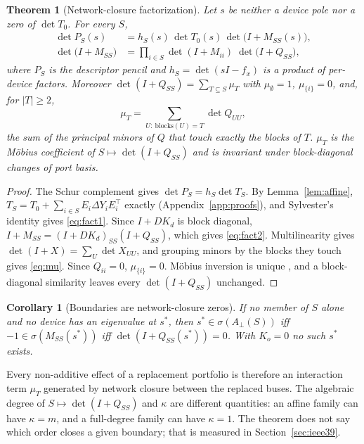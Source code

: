 \documentclass[journal]{IEEEtran}
\newtheorem{theorem}{Theorem}
\newtheorem{corollary}{Corollary}
\theoremstyle{definition}
\theoremstyle{remark}
\newcommand{\Aperp}{A_{\perp}}
\begin{document}
\begin{theorem}[Network-closure factorization]\label{thm:factorization}
Let $s$ be neither a device pole nor a zero of $\det T_0$. For every $S$,
\begin{align}
\det P_S(s)&=h_S(s)\,\det T_0(s)\,\det\!\big(I+M_{SS}(s)\big),\label{eq:fact1}\\
\det\!\big(I+M_{SS}\big)&=\prod_{i\in S}\det(I+M_{ii})\;\det\!\big(I+Q_{SS}\big),
\label{eq:fact2}
\end{align}
where $P_S$ is the descriptor pencil and $h_S=\det(sI-f_x)$ is a product of
per-device factors. Moreover $\det(I+Q_{SS})=\sum_{T\subseteq S}\mu_T$ with
$\mu_\emptyset=1$, $\mu_{\{i\}}=0$, and, for $|T|\ge2$,
\begin{equation}\label{eq:mu}
\mu_T=\sum_{U:\ \mathrm{blocks}(U)=T}\det Q_{UU},
\end{equation}
the sum of the principal minors of $Q$ that touch exactly the blocks of $T$.
$\mu_T$ is the M\"obius coefficient of $S\mapsto\det(I+Q_{SS})$ and is
invariant under block-diagonal changes of port basis.
\end{theorem}
\begin{proof}
The Schur complement gives $\det P_S=h_S\det T_S$. By Lemma~\ref{lem:affine},
$T_S=T_0+\sum_{i\in S}E_i\Delta Y_iE_i^\top$ exactly (Appendix~\ref{app:proofs}),
and Sylvester's identity gives \eqref{eq:fact1}. Since $I+DK_d$ is block
diagonal, $I+M_{SS}=(I+DK_d)_{SS}(I+Q_{SS})$, which gives \eqref{eq:fact2}.
Multilinearity gives $\det(I+X)=\sum_U\det X_{UU}$, and grouping minors by the
blocks they touch gives \eqref{eq:mu}. Since $Q_{ii}=0$, $\mu_{\{i\}}=0$.
M\"obius inversion is unique \cite{rota1964mobius}, and a block-diagonal
similarity leaves every $\det(I+Q_{SS})$ unchanged.
\end{proof}

\begin{corollary}[Boundaries are network-closure zeros]\label{cor:closure}
If no member of $S$ alone and no device has an eigenvalue at $s^*$, then
$s^*\in\sigma(\Aperp(S))$ iff $-1\in\sigma(M_{SS}(s^*))$ iff
$\det(I+Q_{SS}(s^*))=0$. With $K_o=0$ no such $s^*$ exists.
\end{corollary}

Every non-additive effect of a replacement portfolio is therefore an
interaction term $\mu_T$ generated by network closure between the replaced
buses. The algebraic degree of $S\mapsto\det(I+Q_{SS})$ and $\kappa$ are
different quantities: an affine family can have $\kappa=m$, and a full-degree
family can have $\kappa=1$. The theorem does not say which order closes a given
boundary; that is measured in Section~\ref{sec:ieee39}.
\end{document}
